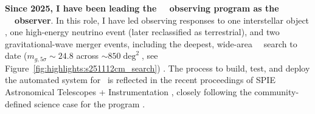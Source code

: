 \textbf{Since 2025, I have been leading the \Rubin\ \ToO\ observing program as the \Rubin\ \ToO\ observer}. In this role, I have led observing responses to one interstellar object \citep{Chandler_2026}, one high-energy neutrino event (later reclassified as terrestrial), and two gravitational-wave merger events, including the deepest, wide-area \GW\ \ToO\ search to date ($m_{g,5\sigma}\sim24.8$ across $\sim850\deg^2$, see Figure~\ref{fig:highlights:s251112cm_search}) \citep{MacBride2026RubinToO,Andreoni2024RubinToO}. %
The process to build, test, and deploy the automated system for \Rubin\ is reflected in the recent proceedings of SPIE Astronomical Telescopes + Instrumentation \citep{MacBride2026RubinToO}, closely following the community-defined science case for the program \citep{Andreoni2024RubinToO}.
